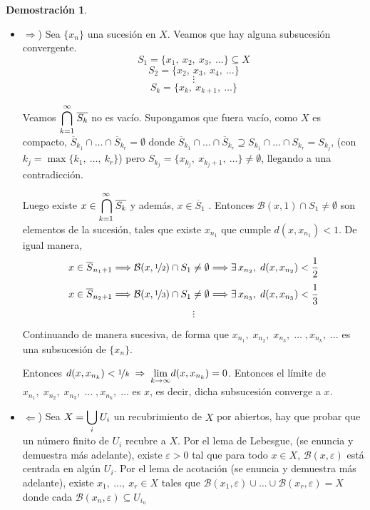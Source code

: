 \documentclass[12pt,twoside]{report}
\newcommand\mc[1]{\mathcal{#1}}
\theoremstyle{azul}
\theoremstyle{azul2}
\theoremstyle{plain}
\theoremstyle{definition}
\newtheorem*{dem}{Demostración}
\theoremstyle{remark}
\newcommand\mbig[2]{\mathlarger{#2}}
\begin{document}
\begin{dem} \: \vspace{-5mm}
\begin{itemize} 
    \item\justifying $\Rightarrow$) Sea $\{x_n\}$ una sucesión en $X$. Veamos que hay alguna subsucesión convergente. 
    $$S_1 = \{ x_1, \: x_2, \: x_3, \: \ldots \} \subseteq X$$
    $$S_2 = \{ x_2, \: x_3, \: x_4, \: \ldots \}$$
    $$\vdots$$
    $$S_k = \{ x_k, \: x_{k+1}, \: \ldots \}$$
    
    Veamos $\overset{\infty}{\underset{k=1}{\mathlarger{\bigcap}}} \: \overline{S_k}$ no es vacío. 
    Supongamos que fuera vacío, como $X$ es compacto, $\overline{S}_{k_1} \cap \ldots \cap \overline{S}_{k_r} = \emptyset$ donde $\overline{S}_{k_1} \cap \ldots \cap \overline{S}_{k_r} \supseteq S_{k_1} \cap \ldots \cap S_{k_r}=S_{k_j}$, (con $k_j = \max \{ k_1, \: \ldots, \: k_r\}$) pero $S_{k_j} = \{ x_{k_j}, \: x_{k_{j}+1}, \: \ldots 
    \} \neq \emptyset$, llegando a una contradicción.
    
    Luego existe $x \in \underset{k=1}{\overset{\infty}{\mathlarger{\mathlarger{}\bigcap}}} \: \overline{S_k}$ y además, $x \in \overline{S}_1$ . Entonces $\mc{B}(x,1) \cap S_1 \neq \emptyset$ son elementos de la sucesión, tales que existe $x_{n_1}$ que cumple $d(x, x_{n_1}) < 1$. De igual manera,
    $$x \in \overline{S}_{n_1 +1} \Longrightarrow \mc{B}(x, \nicefrac{1}{2}) \cap S_1 \neq \emptyset\Longrightarrow \exists\, x_{n_2}, \; d(x, x_{n_2}) < \frac{1}{2}$$
    $$x \in \overline{S}_{n_2 +1} \Longrightarrow  \mc{B}(x, \nicefrac{1}{3}) \cap S_1 \neq \emptyset \Longrightarrow \exists \,x_{n_3}, \; d(x, x_{n_3}) < \frac{1}{3}$$
    $$\vdots$$
    
    Continuando de manera sucesiva, de forma que $x_{n_1}, \; x_{n_2}, \; x_{n_3}, \; \ldots \; , x_{n_k}, \; \ldots $ es una subsucesión de $\{x_n\}$.
    
    Entonces $d(x, x_{n_k})<\nicefrac{1}{k} \; \Rightarrow \; \underset{k \to \infty}{\lim} d(x, x_{n_k}) = 0$. Entonces el límite de $x_{n_1}, \; x_{n_2}, \; x_{n_3}, \; \ldots \; , x_{n_k}, \; \ldots $ es $x$, es decir, dicha subsucesión converge a $x$.
    \item $\Leftarrow$) Sea $X=\underset{i}{\mbig[\bigcup}\: U_i$ un recubrimiento de $X$ por abiertos, hay que probar que un n{\'u}mero finito de $U_i$ recubre a $X$. Por el lema de Lebesgue, (se enuncia y demuestra más adelante), existe $\varepsilon > 0$ tal que para todo $x \in X$, $\mc{B}(x,\varepsilon)$ está centrada en alg{\'u}n $U_i$. Por el lema de acotación (se enuncia y demuestra más adelante), existe $x_1, \: \ldots, \: x_r \in X$ tales que $\mc{B}(x_1, \varepsilon) \cup \ldots \cup \mc{B}(x_r, \varepsilon) = X$ donde cada $\mc{B}(x_n, \varepsilon) \subseteq U_{i_n}$
\end{itemize}
\end{dem}
\end{document}

